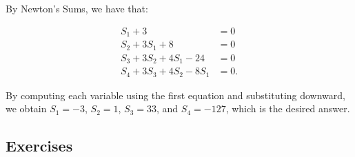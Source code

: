\documentclass[11pt]{scrartcl}
\begin{document}
By Newton's Sums, we have that:

\begin{align*}
S_1+3 &= 0 \\
S_2+3S_1+8 &= 0 \\
S_3+3S_2+4S_1-24 &= 0 \\
S_4+3S_3+4S_2-8S_1 &= 0.
\end{align*}

By computing each variable using the first equation and substituting downward, we obtain $S_1 = -3$, $S_2 = 1$, $S_3 = 33$, and $S_4 = \boxed{-127}$, which is the desired answer.

\subsection{Exercises}
\end{document}
